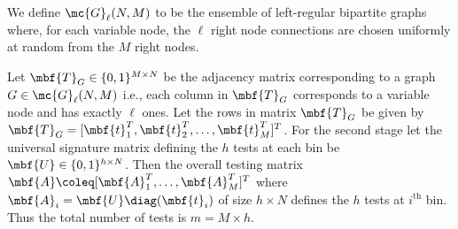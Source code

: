 \documentclass[conference,,twocolumn]{IEEEtran}
\begin{document}
\begin{definition}
We define $\mc{G}_{\ell}(N,M)$ to be the ensemble of left-regular bipartite graphs where, for each variable node, the $\ell$ right node connections are chosen uniformly at random from the $M$ right nodes.
\end{definition}

Let $\mbf{T}_{G}\in\{0,1\}^{M\times N }$ be the adjacency matrix corresponding to a graph $G\in\mc{G}_{\ell}(N,M)$ i.e., each column in $\mbf{T}_{G}$ corresponds to a variable node and has exactly $\ell$ ones. Let the rows in matrix $\mbf{T}_{G}$ be given by $\mbf{T}_{G}=[\mbf{t}^{T}_1,\mbf{t}^{T}_{2},\dots, \mbf{t}^{T}_{M}]^{T}$. For the second stage let the universal signature matrix defining the $h$ tests at each bin be $\mbf{U}\in\{0,1\}^{h\times N}$. Then the overall testing matrix $\mbf{A}\coleq [\mbf{A}_{1}^{T},\ldots,\mbf{A}_{M}^{T}]^T$ where $\mbf{A}_{i}=\mbf{U} \diag (\mbf{t}_i)$ of size $h\times N$ defines the $h$ tests at $i^{\text{th}}$ bin. Thus the total number of tests is $m=M\times h$.

 
\end{document}
